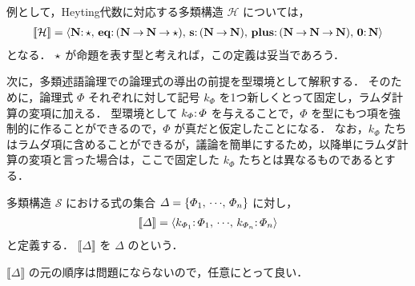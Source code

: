 \documentclass[./main]{subfiles}
\begin{document}
例として，Heyting代数に対応する多類構造 $ \mathscr{H} $ については，
\begin{gather*}
[\![ \mathcal{H} ]\!] = \langle \mathbf{N} \mathord{:}\, \mathord{\star},\, \mathbf{eq} \mathord{:}\, (\mathbf{N} \mathbin{\to} \mathbf{N} \mathbin{\to} \mathord{\star}),\, \mathbf{s} \mathord{:}\, (\mathbf{N} \mathbin{\to} \mathbf{N}),\, \mathbf{plus} \mathord{:}\, (\mathbf{N} \mathbin{\to} \mathbf{N} \mathbin{\to} \mathbf{N}),\, \mathbf{0} \mathord{:}\, \mathbf{N} \rangle
\end{gather*}
となる．
$ \mathord{\star} $ が命題を表す型と考えれば，この定義は妥当であろう．

次に，多類述語論理での論理式の導出の前提を型環境として解釈する．
そのために，論理式 $ \varPhi $ それぞれに対して記号 $ k _\varPhi $ を1つ新しくとって固定し，ラムダ計算の変項に加える．
型環境として $ k _\varPhi \mathord{:}\, \varPhi $ を与えることで，$ \varPhi $ を型にもつ項を強制的に作ることができるので，$ \varPhi $ が真だと仮定したことになる．
なお，$ k _\varPhi $ たちはラムダ項に含めることができるが，議論を簡単にするため，以降単にラムダ計算の変項と言った場合は，ここで固定した $ k _\varPhi $ たちとは異なるものであるとする．

\begin{ziphildefi}
多類構造 $ \mathscr{S} $ における式の集合 $ \varDelta = \{ \varPhi _1,\, \mathord{\cdots},\, \varPhi _n \} $ に対し，
\begin{gather*}
[\![ \varDelta ]\!] = \langle k _{\varPhi _1} \mathord{:}\, \varPhi _1,\, \mathord{\cdots},\, k _{\varPhi _n} \mathord{:}\, \varPhi _n \rangle
\end{gather*}
と定義する．
$ \llbracket \varDelta \rrbracket $ を $ \varDelta $ のという．
\end{ziphildefi}

$ \llbracket \varDelta \rrbracket $ の元の順序は問題にならないので，任意にとって良い．
\end{document}
